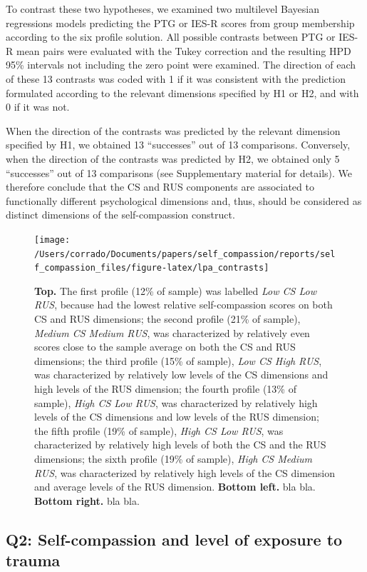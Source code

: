 \documentclass[
  english,
  man,floatsintext]{apa7}
\begin{document}
To contrast these two hypotheses, we examined two multilevel Bayesian regressions models predicting the PTG or IES-R scores from group membership according to the six profile solution. All possible contrasts between PTG or IES-R mean pairs were evaluated with the Tukey correction and the resulting HPD 95\% intervals not including the zero point were examined. The direction of each of these 13 contrasts was coded with 1 if it was consistent with the prediction formulated according to the relevant dimensions specified by H1 or H2, and with 0 if it was not.

When the direction of the contrasts was predicted by the relevant dimension specified by H1, we obtained 13 ``successes'' out of 13 comparisons. Conversely, when the direction of the contrasts was predicted by H2, we obtained only 5 ``successes'' out of 13 comparisons (see Supplementary material for details). We therefore conclude that the CS and RUS components are associated to functionally different psychological dimensions and, thus, should be considered as distinct dimensions of the self-compassion construct.



\begin{figure}
\texttt{[image: /Users/corrado/Documents/papers/self\_compassion/reports/self\_compassion\_files/figure-latex/lpa\_contrasts]} \caption{\textbf{Top.} The first profile (12\% of sample) was labelled \emph{Low CS Low RUS}, because had the lowest relative self-compassion scores on both CS and RUS dimensions; the second profile (21\% of sample), \emph{Medium CS Medium RUS}, was characterized by relatively even scores close to the sample average on both the CS and RUS dimensions; the third profile (15\% of sample), \emph{Low CS High RUS}, was characterized by relatively low levels of the CS dimensions and high levels of the RUS dimension; the fourth profile (13\% of sample), \emph{High CS Low RUS}, was characterized by relatively high levels of the CS dimensions and low levels of the RUS dimension; the fifth profile (19\% of sample), \emph{High CS Low RUS}, was characterized by relatively high levels of both the CS and the RUS dimensions; the sixth profile (19\% of sample), \emph{High CS Medium RUS}, was characterized by relatively high levels of the CS dimension and average levels of the RUS dimension. \textbf{Bottom left.} bla bla. \textbf{Bottom right.} bla bla.}\label{fig:figureLPA}
\end{figure}

\hypertarget{q2-self-compassion-and-level-of-exposure-to-trauma}{%
\subsection{Q2: Self-compassion and level of exposure to trauma}\label{q2-self-compassion-and-level-of-exposure-to-trauma}}
\end{document}
